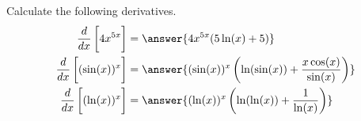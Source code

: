 \documentclass{ximera}
\author{Nela Lakos \and Kyle Parsons}
\begin{document}
\begin{exercise}

Calculate the following derivatives.
\begin{align*}
\ddx\left[\vphantom{\ddx}4x^{5x}\right] &= \answer{4x^{5x}(5\ln(x)+5)}\\
\ddx\left[\vphantom{\ddx}(\sin(x))^x\right] &= \answer{(\sin(x))^x\left(\ln(\sin(x)) + \frac{x\cos(x)}{\sin(x)}\right)}\\
\ddx\left[\vphantom{\ddx}(\ln(x))^x\right] &= \answer{(\ln(x))^x\left(\ln(\ln(x)) + \frac{1}{\ln(x)}\right)}
\end{align*}

\end{exercise}
\end{document}
